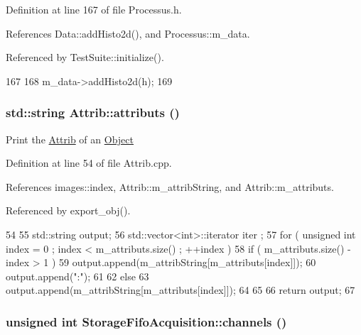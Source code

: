 Definition at line 167 of file Processus.h.

References Data::addHisto2d(), and Processus::m\_\-data.

Referenced by TestSuite::initialize().


\begin{DoxyCode}
167                            {
168     m_data->addHisto2d(h);
169   }
\end{DoxyCode}
\hypertarget{classAttrib_aee7bbf16b144887f196e1341b24f8a26}{
\subsubsection[{attributs}]{\setlength{\rightskip}{0pt plus 5cm}std::string Attrib::attributs ()}}
\label{classAttrib_aee7bbf16b144887f196e1341b24f8a26}
Print the \hyperlink{classAttrib}{Attrib} of an \hyperlink{classObject}{Object} 

Definition at line 54 of file Attrib.cpp.

References images::index, Attrib::m\_\-attribString, and Attrib::m\_\-attributs.

Referenced by export\_\-obj().


\begin{DoxyCode}
54                             {
55   std::string output;
56   std::vector<int>::iterator iter ;
57   for ( unsigned int index = 0 ; index < m_attributs.size() ; ++index ) {
58     if ( m_attributs.size() - index > 1 ) {
59       output.append(m_attribString[m_attributs[index]]);
60       output.append(":");
61     }
62     else {
63       output.append(m_attribString[m_attributs[index]]);
64     }
65   }
66   return output;
67 }
\end{DoxyCode}
\hypertarget{classStorageFifoAcquisition_ab8ff708c3269e56312115df8351bbe24}{
\subsubsection[{channels}]{\setlength{\rightskip}{0pt plus 5cm}unsigned int StorageFifoAcquisition::channels ()}}
\label{classStorageFifoAcquisition_ab8ff708c3269e56312115df8351bbe24}


